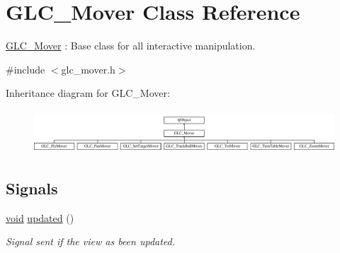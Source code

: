\hypertarget{class_g_l_c___mover}{\section{G\-L\-C\-\_\-\-Mover Class Reference}
\label{class_g_l_c___mover}
}


\hyperlink{class_g_l_c___mover}{G\-L\-C\-\_\-\-Mover} \-: Base class for all interactive manipulation.  




{\ttfamily \#include $<$glc\-\_\-mover.\-h$>$}

Inheritance diagram for G\-L\-C\-\_\-\-Mover\-:\begin{figure}[H]
\begin{center}
\leavevmode
\includegraphics[height=1.643836cm]{class_g_l_c___mover}
\end{center}
\end{figure}
\subsection*{Signals}
\begin{DoxyCompactItemize}
\item 
\hyperlink{group___u_a_v_objects_plugin_ga444cf2ff3f0ecbe028adce838d373f5c}{void} \hyperlink{class_g_l_c___mover_a0fe81c733ad743b7296d51cc57a353d3}{updated} ()
\begin{DoxyCompactList}\small\item\em Signal sent if the view as been updated. \end{DoxyCompactList}\end{DoxyCompactItemize}
